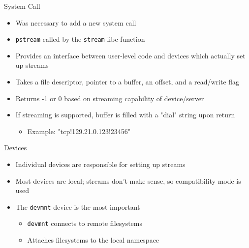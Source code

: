 \documentclass[11pt,compress]{beamer}
\begin{document}
\begin{frame}{System Call}
\begin{itemize}
	\item Was necessary to add a new system call
	\item {\tt pstream} called by the {\tt stream} libc function
	\item Provides an interface between user-level code and devices which actually set up streams
	\item Takes a file descriptor, pointer to a buffer, an offset, and a read/write flag
	\item Returns -1 or 0 based on streaming capability of device/server
	\item If streaming is supported, buffer is filled with a "dial" string upon return
	\begin{itemize}
		\item Example: "tcp!129.21.0.123!23456"
	\end{itemize}
\end{itemize}
\end{frame}

\begin{frame}{Devices}
\begin{itemize}
	\item Individual devices are responsible for setting up streams
	\item Most devices are local; streams don't make sense, so compatibility mode is used
	\item The {\tt devmnt} device is the most important
	\begin{itemize}
		\item {\tt devmnt} connects to remote filesystems
		\item Attaches filesystems to the local namespace
	\end{itemize}
\end{itemize}
\end{frame}
\end{document}
